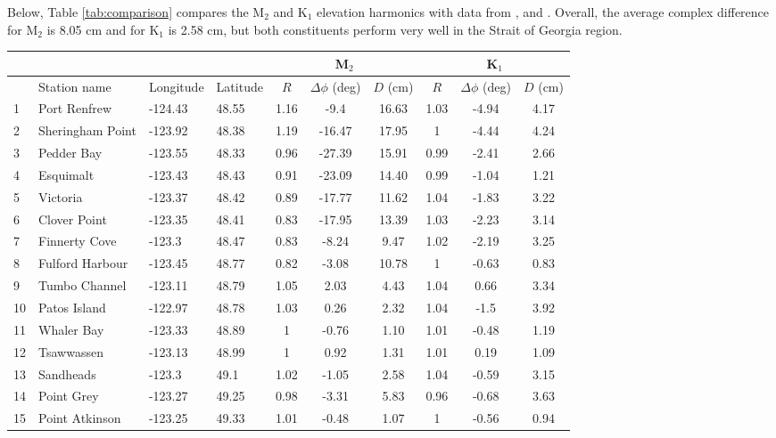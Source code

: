\documentclass[pdftex,10pt]{article}
\begin{document}
Below, Table \ref{tab:comparison} compares the M$_2$ and K$_1$ elevation harmonics with data from \citet{foreman1995tidal}, \citet{foreman2004m} and \citet{foreman2012circulation}. Overall, the average complex difference for M$_2$ is 8.05 cm and for K$_1$ is 2.58 cm, but both constituents perform very well in the Strait of Georgia region. 

\begin{table}[h]
\centering 
\begin{tabular}{l l l l c c c c c c} 
\hline 
& & & & \multicolumn{3}{c}{M$_2$} & \multicolumn{3}{c}{K$_1$} \\ 
\hline 
            & Station name     & Longitude & Latitude & $R$ & $ \Delta \phi$ (deg) & $D$ (cm) & $R$ & $ \Delta \phi$ (deg) & $D$ (cm) \\
\hline 
1 & Port Renfrew & -124.43 & 48.55 & 1.16 & -9.4 & 16.63  & 1.03 & -4.94 & 4.17 \\
2 & Sheringham Point & -123.92 & 48.38 & 1.19 & -16.47 & 17.95  & 1 & -4.44 & 4.24 \\
3 & Pedder Bay & -123.55 & 48.33 & 0.96 & -27.39 & 15.91  & 0.99 & -2.41 & 2.66 \\
4 & Esquimalt & -123.43 & 48.43 & 0.91 & -23.09 & 14.40  & 0.99 & -1.04 & 1.21 \\
5 & Victoria & -123.37 & 48.42 & 0.89 & -17.77 & 11.62  & 1.04 & -1.83 & 3.22 \\
6 & Clover Point & -123.35 & 48.41 & 0.83 & -17.95 & 13.39  & 1.03 & -2.23 & 3.14 \\
7 & Finnerty Cove & -123.3 & 48.47 & 0.83 & -8.24 & 9.47  & 1.02 & -2.19 & 3.25 \\
8 & Fulford Harbour & -123.45 & 48.77 & 0.82 & -3.08 & 10.78  & 1 & -0.63 & 0.83 \\
9 & Tumbo Channel & -123.11 & 48.79 & 1.05 & 2.03 & 4.43  & 1.04 & 0.66 & 3.34 \\
10 & Patos Island & -122.97 & 48.78 & 1.03 & 0.26 & 2.32  & 1.04 & -1.5 & 3.92 \\
11 & Whaler Bay & -123.33 & 48.89 & 1 & -0.76 & 1.10  & 1.01 & -0.48 & 1.19 \\
12 & Tsawwassen & -123.13 & 48.99 & 1 & 0.92 & 1.31  & 1.01 & 0.19 & 1.09 \\
13 & Sandheads & -123.3 & 49.1 & 1.02 & -1.05 & 2.58  & 1.04 & -0.59 & 3.15 \\
14 & Point Grey & -123.27 & 49.25 & 0.98 & -3.31 & 5.83  & 0.96 & -0.68 & 3.63 \\
15 & Point Atkinson & -123.25 & 49.33 & 1.01 & -0.48 & 1.07  & 1 & -0.56 & 0.94 \\

\end{tabular}
\end{table}
\end{document}
